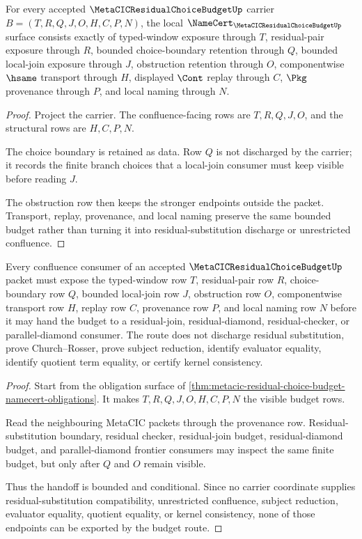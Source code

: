 \begin{theorem}
\label{thm:metacic-residual-choice-budget-namecert-obligations}
For every accepted $\MetaCICResidualChoiceBudgetUp$ carrier $B=(T,R,Q,J,O,H,C,P,N)$, the local $\NameCert_{\MetaCICResidualChoiceBudgetUp}$ surface consists exactly of typed-window exposure through $T$, residual-pair exposure through $R$, bounded choice-boundary retention through $Q$, bounded local-join exposure through $J$, obstruction retention through $O$, componentwise $\hsame$ transport through $H$, displayed $\Cont$ replay through $C$, $\Pkg$ provenance through $P$, and local naming through $N$.
\end{theorem}
\begin{proof}
Project the carrier. The confluence-facing rows are $T,R,Q,J,O$, and the structural rows are $H,C,P,N$.

The choice boundary is retained as data. Row $Q$ is not discharged by the carrier; it records the finite branch choices that a local-join consumer must keep visible before reading $J$.

The obstruction row then keeps the stronger endpoints outside the packet. Transport, replay, provenance, and local naming preserve the same bounded budget rather than turning it into residual-substitution discharge or unrestricted confluence.
\end{proof}

\begin{theorem}
\label{thm:metacic-residual-choice-budget-frontier-route}
Every confluence consumer of an accepted $\MetaCICResidualChoiceBudgetUp$ packet must expose the typed-window row $T$, residual-pair row $R$, choice-boundary row $Q$, bounded local-join row $J$, obstruction row $O$, componentwise transport row $H$, replay row $C$, provenance row $P$, and local naming row $N$ before it may hand the budget to a residual-join, residual-diamond, residual-checker, or parallel-diamond consumer. The route does not discharge residual substitution, prove Church--Rosser, prove subject reduction, identify evaluator equality, identify quotient term equality, or certify kernel consistency.
\end{theorem}
\begin{proof}
Start from the obligation surface of \autoref{thm:metacic-residual-choice-budget-namecert-obligations}. It makes $T,R,Q,J,O,H,C,P,N$ the visible budget rows.

Read the neighbouring MetaCIC packets through the provenance row. Residual-substitution boundary, residual checker, residual-join budget, residual-diamond budget, and parallel-diamond frontier consumers may inspect the same finite budget, but only after $Q$ and $O$ remain visible.

Thus the handoff is bounded and conditional. Since no carrier coordinate supplies residual-substitution compatibility, unrestricted confluence, subject reduction, evaluator equality, quotient equality, or kernel consistency, none of those endpoints can be exported by the budget route.
\end{proof}


